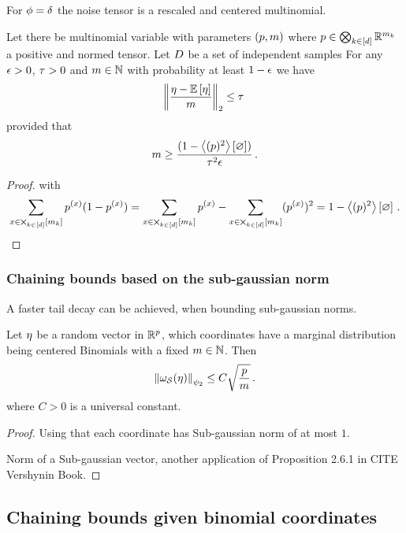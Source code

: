 For $\phi=\delta$ the noise tensor is a rescaled and centered multinomial.

\begin{corollary}
	Let there be multinomial variable with parameters $(p,m)$ where $p\in\bigotimes_{k\in[d]} \mathbb{R}^{m_{k}}$ a positive and normed tensor.
	Let $D$ be a set of independent samples
	For any $\epsilon>0$, $\tau>0$ and $m\in\mathbb{N}$ with probability at least $1-\epsilon$ we have
		\[ \left\|\frac{\eta-\mathbb{E}\left[\eta\right]}{m}\right\|_{2} \leq   \tau \, \]
	provided that
		\[ m \geq  \frac{(1-\left\langle (p)^2\right\rangle \left[ \varnothing \right])}{\tau^2 \epsilon} \, . \]
\end{corollary}
\begin{proof}
	 with
		\[ \sum_{x\in\bigtimes_{k\in[d]}[m_{k}]} p^{(x)}(1-p^{(x)}) = \sum_{x\in\bigtimes_{k\in[d]}[m_{k}]} p^{(x)} - \sum_{x\in\bigtimes_{k\in[d]}[m_{k}]} (p^{(x)})^2 = 1-\left\langle (p)^2\right\rangle \left[ \varnothing \right] \, . \]
\end{proof}



\subsubsection{Chaining bounds based on the sub-gaussian norm}


A faster tail decay can be achieved, when bounding sub-gaussian norms.


\begin{theorem}
	Let $\eta$ be a random vector in $\mathbb{R}^p$, which coordinates have a marginal distribution being centered Binomials with a fixed $m\in\mathbb{N}$.
	Then
		\[ \left\|\omega_{\mathcal{S}}(\eta)\right\|_{\psi_2} \leq C \sqrt{\frac{p}{m}} \, . \]
	where $C>0$ is a universal constant.
\end{theorem}
\begin{proof}
	Using that each coordinate has Sub-gaussian norm of at most $1$.

	
	Norm of a Sub-gaussian vector, another application of Proposition 2.6.1 in CITE Vershynin Book.
\end{proof}




\subsection{Chaining bounds given binomial coordinates}\label{sec:chainingWidthBounds}


